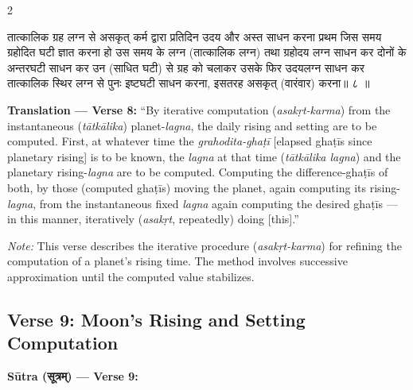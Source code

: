 \documentclass[11pt,a4paper]{article}
\newcommand{\dev}[1]{{\devanagarifont #1}}
\newenvironment{sanskritverse}{%
  \begin{center}\begin{minipage}{0.95\textwidth}
  \setlength{\leftskip}{1em}
  \setlength{\rightskip}{1em}
  \dev
}{\end{minipage}\end{center}}
\begin{document}
\begin{paracol}{2}

\begin{sanskritverse}
तात्कालिक ग्रह लग्न से असकृत् कर्म द्वारा प्रतिदिन उदय और अस्त साधन करना
प्रथम जिस समय ग्रहोदित घटी ज्ञात करना हो उस समय के लग्न (तात्कालिक लग्न)
तथा ग्रहोदय लग्न साधन कर दोनों के अन्तरघटी साधन कर उन (साधित घटी) से ग्रह
को चलाकर उसके फिर उदयलग्न साधन कर तात्कालिक स्थिर लग्न से पुनः इष्टघटी
साधन करना, इसतरह असकृत् (वारंवार) करना॥ ८ ॥
\end{sanskritverse}

\switchcolumn

\textbf{Translation — Verse 8:} ``By iterative computation (\textit{asakṛt-karma}) from the instantaneous (\textit{tātkālika}) planet-\textit{lagna}, the daily rising and setting are to be computed. First, at whatever time the \textit{grahodita-ghaṭī} [elapsed ghaṭīs since planetary rising] is to be known, the \textit{lagna} at that time (\textit{tātkālika lagna}) and the planetary rising-\textit{lagna} are to be computed. Computing the difference-ghaṭīs of both, by those (computed ghaṭīs) moving the planet, again computing its rising-\textit{lagna}, from the instantaneous fixed \textit{lagna} again computing the desired ghaṭīs --- in this manner, iteratively (\textit{asakṛt}, repeatedly) doing [this].''

\textit{Note:} This verse describes the iterative procedure (\textit{asakṛt-karma}) for refining the computation of a planet's rising time. The method involves successive approximation until the computed value stabilizes.

\end{paracol}

\subsection{Verse 9: Moon's Rising and Setting Computation}

\vspace{0.5em}
\noindent\textbf{Sūtra (\dev{सूत्रम्}) — Verse 9:}
\end{document}
